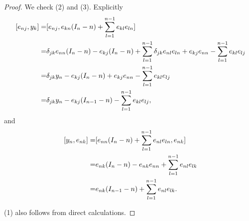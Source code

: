 \documentclass[10pt,a4paper]{amsart}
\begin{document}
\begin{proof}
%
%
%
 We check (2) and (3). Explicitly
$$\aligned \ [e_{nj},y_k]
=&[e_{nj},e_{kn}(I_{n}-n)
+\sum_{l=1}^{n-1} e_{kl}e_{ln}]\\
=& \delta_{jk}e_{nn}(I_n-n)-e_{kj}(I_n-n)
+\sum_{l=1}^{n-1} \delta_{jk}e_{nl}e_{ln}
+ e_{kj}e_{nn}
-\sum_{l=1}^{n-1} e_{kl}e_{lj}\\
=& \delta_{jk}y_n-e_{kj}(I_n-n)
+ e_{kj}e_{nn}
-\sum_{l=1}^{n-1} e_{kl}e_{lj}\\
=& \delta_{jk}y_n-e_{kj}(I_{n-1}-n)
-\sum_{l=1}^{n-1} e_{kl}e_{lj},
\endaligned$$
and
$$\aligned \  [y_n,e_{nk}]
=&[e_{nn}(I_{n}-n)
+\sum_{l=1}^{n-1} e_{nl}e_{ln},e_{nk}]\\
=& e_{nk}(I_{n}-n)
-e_{nk}e_{nn}
+\sum_{l=1}^{n-1} e_{nl}e_{lk}\\
=& e_{nk}(I_{n-1}-n)+\sum_{l=1}^{n-1} e_{nl}e_{lk}.
\endaligned$$

(1) also follows from direct calculations.
\end{proof}
\end{document}
